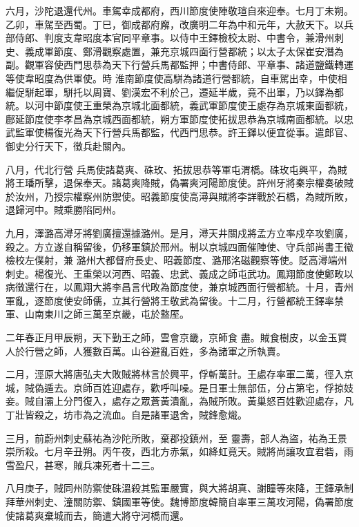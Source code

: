 \begin{pinyinscope}
 六月，沙陀退還代州。車駕幸成都府，西川節度使陣敬瑄自來迎奉。七月丁未朔。乙卯，車駕至西蜀。丁巳，御成都府廨，改廣明二年為中和元年，大赦天下。以兵部侍郎、判度支韋昭度本官同平章事。以侍中王鐸檢校太尉、中書令，兼滑州刺史、義成軍節度、鄭滑觀察處置，兼充京城四面行營都統；以太子太保崔安潛為副。觀軍容使西門思恭為天下行營兵馬都監押；中書侍郎、平章事、諸道鹽鐵轉運等使韋昭度為供軍使。時
 淮南節度使高駢為諸道行營都統，自車駕出幸，中使相繼促駢起軍，駢托以周寶、劉漢宏不利於己，遷延半歲，竟不出軍，乃以鐸為都統。以河中節度使王重榮為京城北面都統，義武軍節度使王處存為京城東面都統，鄜延節度使李孝昌為京城西面都統，朔方軍節度使拓拔思恭為京城南面都統。以忠武監軍使楊復光為天下行營兵馬都監，代西門思恭。許王鐸以便宜從事。遣郎官、御史分行天下，徵兵赴關內。



 八月，代北行營
 兵馬使諸葛爽、硃玫、拓拔思恭等軍屯渭橋。硃玫屯興平，為賊將王璠所擊，退保奉天。諸葛爽降賊，偽署爽河陽節度使。許州牙將秦宗權奏破賊於汝州，乃授宗權察州防禦使。昭義節度使高潯與賊將李詳戰於石橋，為賊所敗，退歸河中。賊乘勝陷同州。



 九月，澤潞高潯牙將劉廣擅還據潞州。是月，潯天井關戍將孟方立率戍卒攻劉廣，殺之。方立遂自稱留後，仍移軍鎮於邢州。制以京城四面催陣使、守兵部尚書王徽檢校左僕射，兼
 潞州大都督府長史、昭義節度、潞邢洺磁觀察等使。貶高潯端州刺史。楊復光、王重榮以河西、昭義、忠武、義成之師屯武功。鳳翔節度使鄭畋以病徵還行在，以鳳翔大將李昌言代畋為節度使，兼京城西面行營都統。十月，青州軍亂，逐節度使安師儒，立其行營將王敬武為留後。十二月，行營都統王鐸率禁軍、山南東川之師三萬至京畿，屯於盩厔。



 二年春正月甲辰朔，天下勤王之師，雲會京畿，京師食
 盡。賊食樹皮，以金玉買人於行營之師，人獲數百萬。山谷避亂百姓，多為諸軍之所執賣。



 二月，涇原大將唐弘夫大敗賊將林言於興平，俘斬萬計。王處存率軍二萬，徑入京城，賊偽遁去。京師百姓迎處存，歡呼叫噪。是日軍士無部伍，分占第宅，俘掠妓妾。賊自灞上分門復入，處存之眾蒼黃潰亂，為賊所敗。黃巢怒百姓歡迎處存，凡丁壯皆殺之，坊市為之流血。自是諸軍退舍，賊鋒愈熾。



 三月，前蔚州刺史蘇祐為沙陀所敗，棄郡投鎮州，至
 靈壽，部人為盜，祐為王景崇所殺。七月辛丑朔。丙午夜，西北方赤氣，如絳虹竟天。賊將尚讓攻宜君砦，雨雪盈尺，甚寒，賊兵凍死者十二三。



 八月庚子，賊同州防禦使硃溫殺其監軍嚴實，與大將胡真、謝瞳等來降，王鐸承制拜華州刺史、潼關防禦、鎮國軍等使。魏博節度韓簡自率軍三萬攻河陽，偽署節度使諸葛爽棄城而去，簡遣大將守河橋而還。




\end{pinyinscope}
